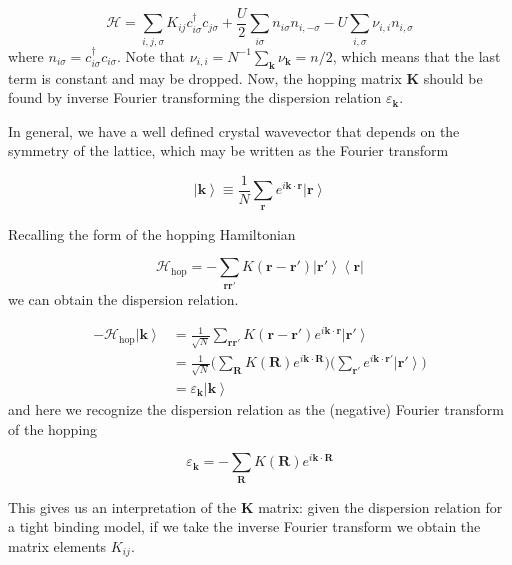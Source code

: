 \documentclass[10pt, twocolumn, twoside]{article}
\begin{document}
\begin{equation}
\mathcal{H} = \sum_{i, j, \sigma} K_{ij} c_{i\sigma}^\dagger c_{j\sigma} + \frac{U}{2} \sum_{i\sigma} n_{i\sigma} n_{i, -\sigma} - U \sum_{i, \sigma} \nu_{i, i} n_{i, \sigma}
\end{equation}
where $n_{i\sigma} = c_{i\sigma}^\dagger c_{i\sigma}$. Note that $\nu_{i, i} = N^{-1} \sum_{\bm k} \nu_{\bm k} = n/2$, which means that the last term is constant and may be dropped. Now, the hopping matrix $\bm K$ should be found by inverse Fourier transforming the dispersion relation $\varepsilon_{\bm k}$.

In general, we have a well defined crystal wavevector that depends on the symmetry of the lattice, which may be written as the Fourier transform

\begin{equation}
\left| \bm k \right\rangle \equiv \frac{1}{N} \sum_{\bm r} e^{i\bm k \cdot \bm r} \left| \bm r \right\rangle
\end{equation}

Recalling the form of the hopping Hamiltonian

\begin{equation}
\mathcal{H}_{\text{hop}} = - \sum_{\bm r \bm r'} K (\bm r - \bm r') \left| \bm r' \right\rangle \left\langle \bm r \right|
\end{equation}
we can obtain the dispersion relation.

\begin{equation}
\begin{split}
- \mathcal{H}_{\text{hop}} \left| \bm k \right\rangle &= \frac{1}{\sqrt{N}} \sum_{\bm r \bm r'} K ( \bm r - \bm r' ) e^{i \bm k \cdot \bm r} \left| \bm r' \right \rangle \\
&= \frac{1}{\sqrt{N}} \bigg( \sum_{\bm R} K(\bm R) e^{i\bm k \cdot \bm R} \bigg) \bigg( \sum_{\bm r'} e^{i\bm k \cdot \bm r'} \left| \bm r' \right\rangle \bigg) \\
& = \varepsilon_{\bm k} \left| \bm k \right\rangle
\end{split}
\end{equation}
and here we recognize the dispersion relation as the (negative) Fourier transform of the hopping

\begin{equation}
\varepsilon_{\bm k} = - \sum_{\bm R} K(\bm R) e^{i\bm k \cdot \bm R} 
\end{equation}

This gives us an interpretation of the $\bm K$ matrix: given the dispersion relation for a tight binding model, if we take the inverse Fourier transform we obtain the matrix elements $K_{i j}$.
\end{document}
